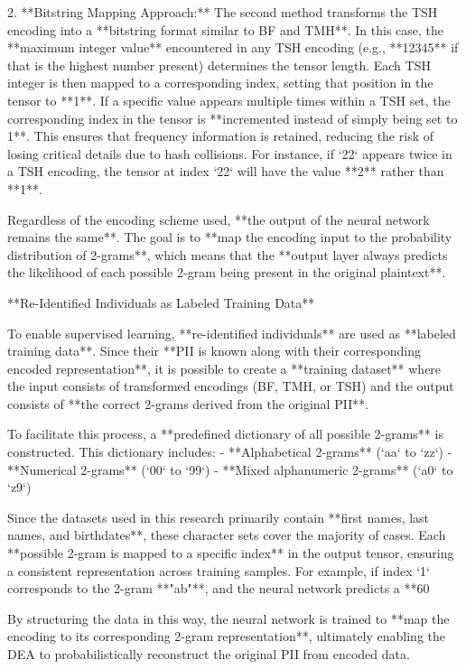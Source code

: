 2. **Bitstring Mapping Approach:**
   The second method transforms the TSH encoding into a **bitstring format similar to BF and TMH**. In this case, the **maximum integer value** encountered in any TSH encoding (e.g., **12345** if that is the highest number present) determines the tensor length. Each TSH integer is then mapped to a corresponding index, setting that position in the tensor to **1**. If a specific value appears multiple times within a TSH set, the corresponding index in the tensor is **incremented instead of simply being set to 1**. This ensures that frequency information is retained, reducing the risk of losing critical details due to hash collisions. For instance, if `22` appears twice in a TSH encoding, the tensor at index `22` will have the value **2** rather than **1**.

Regardless of the encoding scheme used, **the output of the neural network remains the same**. The goal is to **map the encoding input to the probability distribution of 2-grams**, which means that the **output layer always predicts the likelihood of each possible 2-gram being present in the original plaintext**.

 **Re-Identified Individuals as Labeled Training Data**

To enable supervised learning, **re-identified individuals** are used as **labeled training data**. Since their **PII is known along with their corresponding encoded representation**, it is possible to create a **training dataset** where the input consists of transformed encodings (BF, TMH, or TSH) and the output consists of **the correct 2-grams derived from the original PII**.

To facilitate this process, a **predefined dictionary of all possible 2-grams** is constructed. This dictionary includes:
- **Alphabetical 2-grams** (`aa` to `zz`)
- **Numerical 2-grams** (`00` to `99`)
- **Mixed alphanumeric 2-grams** (`a0` to `z9`)

Since the datasets used in this research primarily contain **first names, last names, and birthdates**, these character sets cover the majority of cases. Each **possible 2-gram is mapped to a specific index** in the output tensor, ensuring a consistent representation across training samples. For example, if index `1` corresponds to the 2-gram **"ab"**, and the neural network predicts a **60%

By structuring the data in this way, the neural network is trained to **map the encoding to its corresponding 2-gram representation**, ultimately enabling the DEA to probabilistically reconstruct the original PII from encoded data.

